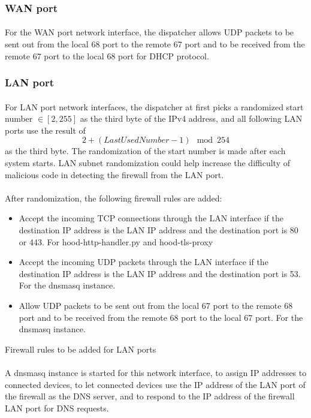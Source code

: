 \documentclass[mscthesis]{usiinfthesis}
\begin{document}
\subsubsection{WAN port}
\paragraph{}
For the WAN port network interface, the dispatcher allows UDP packets to be sent out from the local 68 port to the remote 67 port and to be received from the remote 67 port to the local 68 port for DHCP protocol.
\subsubsection{LAN port}
\paragraph{}
For LAN port network interfaces, the dispatcher at first picks a randomized start number \(\in [2, 255]\) as the third byte of the IPv4 address, and all following LAN ports use the result of \[2 + (Last Used Number - 1) \mod 254\] as the third byte. The randomization of the start number is made after each system starts. LAN subnet randomization could help increase the difficulty of malicious code in detecting the firewall from the LAN port.
\paragraph{}
After randomization, the following firewall rules are added:
\begin{table}[H]
  \begin{itemize}
    \item Accept the incoming TCP connections through the LAN interface if the destination IP address is the LAN IP address and the destination port is 80 or 443. For hood-http-handler.py and hood-tls-proxy
    \item Accept the incoming UDP packets through the LAN interface if the destination IP address is the LAN IP address and the destination port is 53. For the dnsmasq instance.
    \item Allow UDP packets to be sent out from the local 67 port to the remote 68 port and to be received from the remote 68 port to the local 67 port. For the dnsmasq instance.
  \end{itemize}
  \caption{Firewall rules to be added for LAN ports}
  \label{lst:LAN-rules}
\end{table}
\paragraph{}
A dnsmasq instance is started for this network interface, to assign IP addresses to connected devices, to let connected devices use the IP address of the LAN port of the firewall as the DNS server, and to respond to the IP address of the firewall LAN port for DNS requests.
\end{document}
